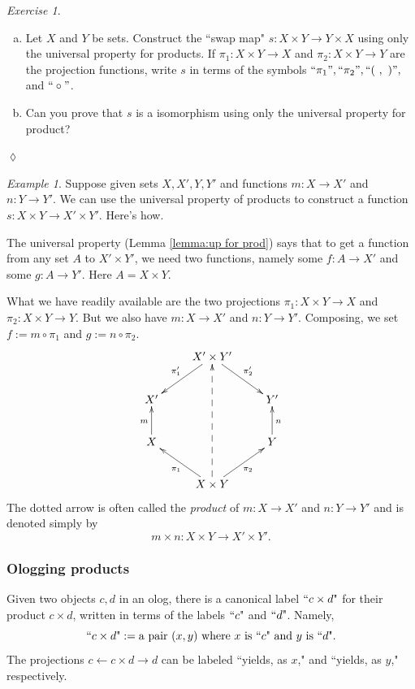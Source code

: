 \documentclass{book}
\def\tn{\textnormal}
\newcommand{\qt}[1]{\tn{``}#1\tn{"}}
\def\to{\rightarrow}
\def\from{\leftarrow}
\def\taking{\colon}
\theoremstyle{remark}
\newtheorem{example}[subsubsection]{Example}
\newtheorem{exc}[subsubsection]{Exercise}
\newenvironment{exercise}{\begin{exc}}{\hspace*{\fill}$\lozenge$\end{exc}}
\theoremstyle{definition}
\def\sexc{\begin{enumerate}[a.)]\setlength{\itemsep}{.1cm}\setlength{\parskip}{.1cm}\item}
\def\next{\item}
\def\endsexc{\end{enumerate}}
\begin{document}
\begin{exercise}~
\sexc Let $X$ and $Y$ be sets. Construct the ``swap map" $s\taking X\times Y\to Y\times X$ using only the universal property for products. If $\pi_1\taking X\times Y\to X$ and $\pi_2\taking X\times Y\to Y$ are the projection functions, write $s$ in terms of the symbols $``\pi_1",``\pi_2", ``(\ ,\ )",$ and $``\circ"$. 
\next Can you prove that $s$ is a isomorphism using only the universal property for product?
\endsexc
\end{exercise}

\begin{example}\label{ex:product to product}
Suppose given sets $X,X', Y, Y'$ and functions $m\taking X\to X'$ and $n\taking Y\to Y'$. We can use the universal property of products to construct a function $s\taking X\times Y\to X'\times Y'$.  Here's how.

The universal property (Lemma \ref{lemma:up for prod}) says that to get a function from any set $A$ to $X'\times Y'$, we need two functions, namely some $f\taking A\to X'$ and some $g\taking A\to Y'$. Here $A=X\times Y$. 

What we have readily available are the two projections $\pi_1\taking X\times Y\to X$ and $\pi_2\taking X\times Y\to Y$. But we also have $m\taking X\to X'$ and $n\taking Y\to Y'$. Composing, we set $f:=m\circ \pi_1$ and $g:=n\circ\pi_2$.
$$\xymatrix{
&X'\times Y'\ar[dl]_{\pi_1'}\ar[dr]^{\pi_2'}\\
X'&&Y'\\
X\ar[u]^m&&Y\ar[u]_n\\
&X\times Y\ar[ul]^{\pi_1}\ar[ur]_{\pi_2}\ar@{-->}[uuu]
}
$$
The dotted arrow is often called the {\em product} of $m\taking X\to X'$ and $n\taking Y\to Y'$ and is denoted simply by 
$$m\times n\taking X\times Y\to X'\times Y'.$$

\end{example}


\subsubsection{Ologging products}\label{sec:ologging products}

Given two objects $c,d$ in an olog, there is a canonical label $\qt{c\times d}$ for their product $c\times d$, written in terms of the labels $\qt{c}$ and $\qt{d}$. Namely, $$\qt{c\times d}:=\tn{a pair }(x,y)\tn{ where }x\tn{ is }\qt{c}\tn{ and }y\tn{ is }\qt{d}.$$ The projections $c\from c\times d\to d$ can be labeled ``yields, as $x$," and ``yields, as $y$," respectively.
\end{document}
